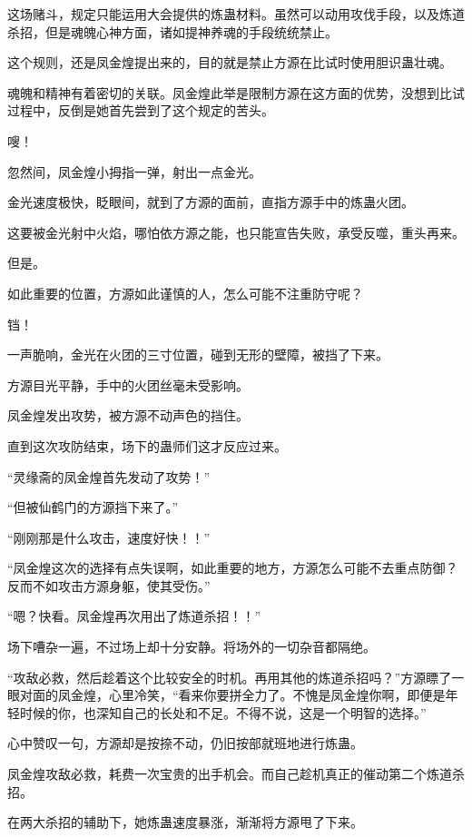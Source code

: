 
\begin{this_body}

这场赌斗，规定只能运用大会提供的炼蛊材料。虽然可以动用攻伐手段，以及炼道杀招，但是魂魄心神方面，诸如提神养魂的手段统统禁止。

这个规则，还是凤金煌提出来的，目的就是禁止方源在比试时使用胆识蛊壮魂。

魂魄和精神有着密切的关联。凤金煌此举是限制方源在这方面的优势，没想到比试过程中，反倒是她首先尝到了这个规定的苦头。

嗖！

忽然间，凤金煌小拇指一弹，射出一点金光。

金光速度极快，眨眼间，就到了方源的面前，直指方源手中的炼蛊火团。

这要被金光射中火焰，哪怕依方源之能，也只能宣告失败，承受反噬，重头再来。

但是。

如此重要的位置，方源如此谨慎的人，怎么可能不注重防守呢？

铛！

一声脆响，金光在火团的三寸位置，碰到无形的壁障，被挡了下来。

方源目光平静，手中的火团丝毫未受影响。

凤金煌发出攻势，被方源不动声色的挡住。

直到这次攻防结束，场下的蛊师们这才反应过来。

“灵缘斋的凤金煌首先发动了攻势！”

“但被仙鹤门的方源挡下来了。”

“刚刚那是什么攻击，速度好快！！”

“凤金煌这次的选择有点失误啊，如此重要的地方，方源怎么可能不去重点防御？反而不如攻击方源身躯，使其受伤。”

“嗯？快看。凤金煌再次用出了炼道杀招！！”

场下嘈杂一遍，不过场上却十分安静。将场外的一切杂音都隔绝。

“攻敌必救，然后趁着这个比较安全的时机。再用其他的炼道杀招吗？”方源瞟了一眼对面的凤金煌，心里冷笑，“看来你要拼全力了。不愧是凤金煌你啊，即便是年轻时候的你，也深知自己的长处和不足。不得不说，这是一个明智的选择。”

心中赞叹一句，方源却是按捺不动，仍旧按部就班地进行炼蛊。

凤金煌攻敌必救，耗费一次宝贵的出手机会。而自己趁机真正的催动第二个炼道杀招。

在两大杀招的辅助下，她炼蛊速度暴涨，渐渐将方源甩了下来。


\end{this_body}
